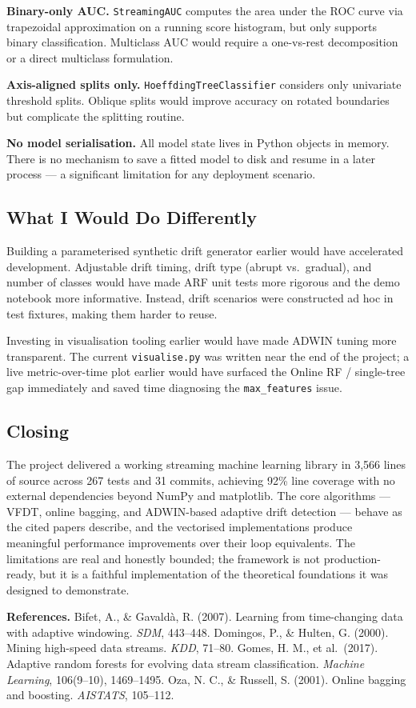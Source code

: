 \documentclass[10pt,a4paper]{article}
\begin{document}
\textbf{Binary-only AUC.} \texttt{StreamingAUC} computes the area under the ROC curve via trapezoidal approximation on a running score histogram, but only supports binary classification. Multiclass AUC would require a one-vs-rest decomposition or a direct multiclass formulation.

\textbf{Axis-aligned splits only.} \texttt{HoeffdingTreeClassifier} considers only univariate threshold splits. Oblique splits would improve accuracy on rotated boundaries but complicate the splitting routine.

\textbf{No model serialisation.} All model state lives in Python objects in memory. There is no mechanism to save a fitted model to disk and resume in a later process --- a significant limitation for any deployment scenario.

\subsection{What I Would Do Differently}

Building a parameterised synthetic drift generator earlier would have accelerated development. Adjustable drift timing, drift type (abrupt vs.\ gradual), and number of classes would have made ARF unit tests more rigorous and the demo notebook more informative. Instead, drift scenarios were constructed ad hoc in test fixtures, making them harder to reuse.

Investing in visualisation tooling earlier would have made ADWIN tuning more transparent. The current \texttt{visualise.py} was written near the end of the project; a live metric-over-time plot earlier would have surfaced the Online RF / single-tree gap immediately and saved time diagnosing the \texttt{max\_features} issue.

\subsection{Closing}

The project delivered a working streaming machine learning library in 3{,}566 lines of source across 267 tests and 31 commits, achieving 92\% line coverage with no external dependencies beyond NumPy and matplotlib. The core algorithms --- VFDT, online bagging, and ADWIN-based adaptive drift detection --- behave as the cited papers describe, and the vectorised implementations produce meaningful performance improvements over their loop equivalents. The limitations are real and honestly bounded; the framework is not production-ready, but it is a faithful implementation of the theoretical foundations it was designed to demonstrate.

\vspace{0.8em}
\footnotesize
\textbf{References.} Bifet, A., \& Gavaldà, R. (2007). Learning from time-changing data with adaptive windowing. \emph{SDM}, 443--448. \quad
Domingos, P., \& Hulten, G. (2000). Mining high-speed data streams. \emph{KDD}, 71--80. \quad
Gomes, H. M., et al.\ (2017). Adaptive random forests for evolving data stream classification. \emph{Machine Learning}, 106(9--10), 1469--1495. \quad
Oza, N. C., \& Russell, S. (2001). Online bagging and boosting. \emph{AISTATS}, 105--112.
\end{document}
